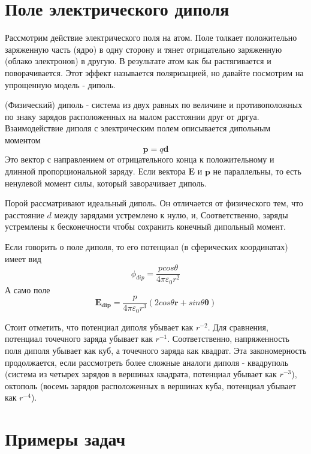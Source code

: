 \documentclass[a4paper,12pt]{article}
\numberwithin{equation}{section}
\begin{document}
\section{Поле электрического диполя}

Рассмотрим действие электрического поля на атом.
Поле толкает положительно заряженную часть (ядро) в одну сторону и тянет отрицательно заряженную (облако электронов) в другую.
В результате атом как бы растягивается и поворачивается.
Этот эффект называется поляризацией, но давайте посмотрим на упрощенную модель - диполь.

(Физический) диполь - система из двух равных по величине и противоположных по знаку зарядов расположенных на малом расстоянии друг от дргуа.
Взаимодействие диполя с электрическим полем описывается дипольным моментом 
\begin{equation}
    \bm{p} = q \bm{d}
\end{equation}
Это вектор с направлением от отрицательного конца к положительному и длинной пропорциональной заряду.
Если вектора $\bm{E}$ и $\bm{p}$ не параллельны, то есть ненулевой момент силы, который заворачивает диполь.

Порой рассматривают идеальный диполь.
Он отличается от физического тем, что расстояние $d$ между зарядами устремлено к нулю, и, Соответственно, заряды устремлены к бесконечности чтобы сохранить конечный дипольный момент.

Если говорить о поле диполя, то его потенциал (в сферических координатах) имеет вид
\begin{equation}
    \phi_{dip} = \frac{p cos \theta}{4 \pi \varepsilon_0 r^2}
\end{equation}
А само поле
\begin{equation}\label{eq:3.3}
    \bm{E_{dip}} = \frac{p}{4 \pi \varepsilon_0 r^3} \left( 2 cos \theta \bm{r} + sin \theta \bm{\theta} \right)
\end{equation}

Стоит отметить, что потенциал диполя убывает как $r^{-2}$.
Для сравнения, потенциал точечного заряда убывает как $r^{-1}$.
Соответственно, напряженность поля диполя убывает как куб, а точечного заряда как квадрат.
Эта закономерность продолжается, если рассмотреть более сложные аналоги диполя - квадруполь (система из четырех зарядов в вершинах квадрата, потенциал убывает как $r^{-3}$), октополь (восемь зарядов расположенных в вершинах куба, потенциал убывает как $r^{-4}$).




\section{Примеры задач}
\end{document}
